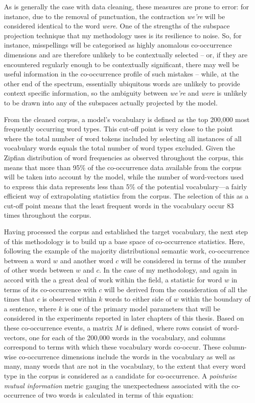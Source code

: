 As is generally the case with data cleaning, these measures are prone to error: for instance, due to the removal of punctuation, the contraction \emph{we're} will be considered identical to the word \emph{were}.  One of the strengths of the subspace projection technique that my methodology uses is its resilience to noise.  So, for instance, misspellings will be categorised as highly anomalous co-occurrence dimensions and are therefore unlikely to be contextually selected -- or, if they are encountered regularly enough to be contextually significant, there may well be useful information in the co-occurrence profile of such mistakes -- while, at the other end of the spectrum, essentially ubiquitous words are unlikely to provide context specific information, so the ambiguity between \emph{we're} and \emph{were} is unlikely to be drawn into any of the subspaces actually projected by the model.

From the cleaned corpus, a model's vocabulary is defined as the top 200,000 most frequently occurring word types.  This cut-off point is very close to the point where the total number of word tokens included by selecting all instances of all vocabulary words equals the total number of word types excluded.  Given the Zipfian distribution of word frequencies as observed throughout the corpus, this means that more than 95\% of the co-occurrence data available from the corpus will be taken into account by the model, while the number of word-vectors used to express this data represents less than 5\% of the potential vocabulary---a fairly efficient way of extrapolating statistics from the corpus.  The selection of this as a cut-off point means that the least frequent words in the vocabulary occur 83 times throughout the corpus.

Having processed the corpus and established the target vocabulary, the next step of this methodology is to build up a base space of co-occurrence statistics.  Here, following the example of the majority distributional semantic work, co-occurrence between a word $w$ and another word $c$ will be considered in terms of the number of other words between $w$ and $c$.  In the case of my methodology, and again in accord with the a great deal of work within the field, a statistic for word $w$ in terms of its co-occurrence with $c$ will be derived from the consideration of all the times that $c$ is observed within $k$ words to either side of $w$ within the boundary of a sentence, where $k$ is one of the primary model parameters that will be considered in the experiments reported in later chapters of this thesis.  Based on these co-occurrence events, a matrix $M$ is defined, where rows consist of word-vectors, one for each of the 200,000 words in the vocabulary, and columns correspond to terms with which these vocabulary words co-occur.  These column-wise co-occurrence dimensions include the words in the vocabulary as well as many, many words that are not in the vocabulary, to the extent that every word type in the corpus is considered as a candidate for co-occurrence.  A \emph{pointwise mutual information} metric gauging the unexpectedness associated with the co-occurrence of two words is calculated in terms of this equation:

